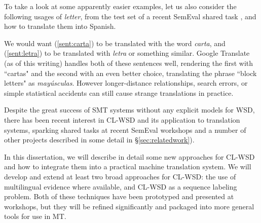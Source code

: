 To take a look at some apparently easier examples, let us also consider the
following usages of \emph{letter}, from the test set of a recent SemEval shared
task \cite{task10}, and how to translate them into Spanish.

\label{sent:carta}
\label{sent:letra}

We would want (\ref{sent:carta}) to be translated with the word \emph{carta},
and (\ref{sent:letra}) to be translated with \emph{letra} or something similar.
Google Translate (as of this writing) handles both of these sentences well,
rendering the first with ``cartas" and the second with an even better choice,
translating the phrase ``block letters" as \emph{mayúsculas}.
However longer-distance relationships, search errors, or simple statistical
accidents can still cause strange translations in practice.

Despite the great success of SMT systems without any explicit models for WSD,
there has been recent interest in CL-WSD and its application to translation
systems, sparking shared tasks at recent SemEval workshops
\cite{lefever-hoste:2010:SemEval,task10} and a number of other projects
described in some detail in \S\ref{sec:relatedwork}).

In this dissertation, we will describe in detail some new approaches for CL-WSD
and how to integrate them into a practical machine translation system.
We will develop and extend at least two broad approaches for CL-WSD: the use of
multilingual evidence where available, and CL-WSD as a sequence labeling
problem.
Both of these techniques have been prototyped and presented at workshops, but
they will be refined significantly and packaged into more general tools for use
in MT.  

